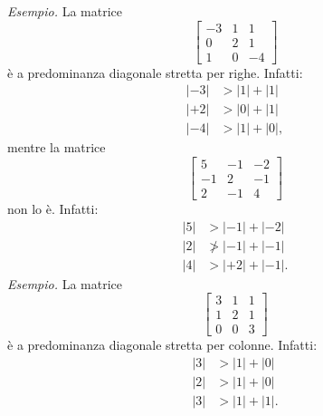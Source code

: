 \textit{Esempio.}
La matrice
\begin{equation*}
    \begin{bmatrix}
    -3 & 1 & 1\\
    0 & 2 & 1\\
    1 & 0 & -4
    \end{bmatrix}
\end{equation*}
è a predominanza diagonale stretta per righe. Infatti:
\begin{equation*}
    \begin{aligned}
    |-3| &  >|1|+|1|\\
    |+2| &  >|0|+|1|\\
    |-4| &  >|1|+|0|,
    \end{aligned}
\end{equation*}
mentre la matrice
\begin{equation*}
    \begin{bmatrix}
    5 & -1 & -2\\
    -1 & 2 & -1\\
    2 & -1 & 4
    \end{bmatrix}
\end{equation*}
non lo è. Infatti:
\begin{equation*}
    \begin{aligned}
    | 5|  &  >| -1| +|-2| \\
    | 2|  & \ngtr | -1| +| -1| \\
    | 4|  &  >| +2| +| -1|.
    \end{aligned}
\end{equation*}
\textit{Esempio.}
La matrice
\begin{equation*}
    \begin{bmatrix}
    3 & 1 & 1\\
    1 & 2 & 1\\
    0 & 0 & 3
    \end{bmatrix}
\end{equation*}
è a predominanza diagonale stretta per colonne. Infatti:
\begin{equation*}
    \begin{aligned}
    |3| &  >|1|+|0|\\
    |2| &  >|1|+|0|\\
    |3| &  >|1|+|1|.
    \end{aligned}
\end{equation*}

